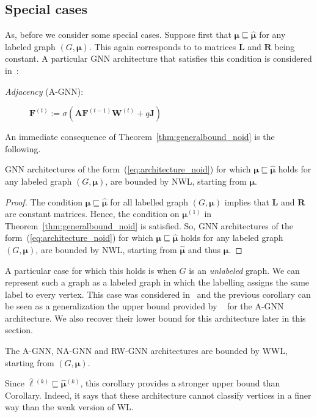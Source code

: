 \subsection{Special cases}
As, before we consider some special cases. Suppose first that
$\pmb{\mu}\sqsubseteq\hat{\pmb{\mu}}$ for any labeled graph $(G,\pmb{\mu})$. This again corresponds to to matrices $\mathbf{L}$ and $\mathbf{R}$ being constant. A particular GNN architecture that satisfies this condition is considered in~\cite{grohewl}:
\begin{description}
 \item[\textit{Adjacency} (A-GNN):]
$
\mathbf{F}^{(t)}:=\sigma\left(\mathbf{A}\mathbf{F}^{(t-1)}\mathbf{W}^{(t)}+q\mathbf{J}\right)
$
\end{description}

An immediate consequence of Theorem~\ref{thm:generalbound_noid} is the following.
\begin{corollary}
	GNN architectures of the form~(\ref{eq:architecture_noid}) for which $\pmb{\mu}\sqsubseteq\hat{\pmb{\mu}}$ holds for any labeled graph $(G,\pmb{\mu})$, are bounded by NWL, starting from $\pmb{\mu}$.
\end{corollary}
\begin{proof}
The condition $\pmb{\mu}\sqsubseteq\hat{\pmb{\mu}}$ for all labelled graph $(G,\pmb{\mu})$ implies that $\mathbf{L}$ and $\mathbf{R}$ are constant matrices. Hence, the condition on
$\pmb{\mu}{}^{(1)}$ in Theorem~\ref{thm:generalbound_noid} is satisfied. So, GNN architectures of the form~(\ref{eq:architecture_noid}) for which $\pmb{\mu}\sqsubseteq\hat{\pmb{\mu}}$ holds for any labeled graph $(G,\pmb{\mu})$, are bounded by NWL, starting from $\hat{\pmb{\mu}}$ and thus $\pmb{\mu}$.
\end{proof}

A particular case for which this holds is when $G$ is an \textit{unlabeled} graph. We can represent such a graph as a labeled graph in which the labelling assigns the same label to
every vertex. This case was considered in~\cite{grohewl} and the previous corollary can be seen as a generalization the upper bound provided by ~\cite{grohewel} for the A-GNN architecture. We also recover their lower bound for this architecture later in this section.



\begin{corollary}
The A-GNN,  NA-GNN  and RW-GNN architectures are bounded by WWL, starting from $(G,\pmb{\mu})$.	
\end{corollary}
Since $\hat{\pmb{\ell}}{}^{(k)}\sqsubseteq \hat{\pmb{\mu}}{}^{(k)}$, this corollary provides a stronger upper bound than Corollary. Indeed, it says that these architecture cannot classify vertices in a finer way than the weak version of WL. 


